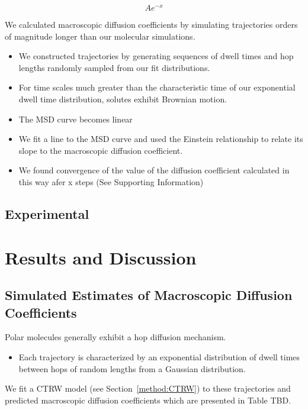 \documentclass{article}
\begin{document}
  \begin{equation}
	Ae^{-x}
  \end{equation}

  We calculated macroscopic diffusion coefficients by simulating trajectories orders of
  magnitude longer than our molecular simulations. 
  \begin{itemize}
	\item We constructed trajectories by generating sequences of dwell times 
        and hop lengths randomly sampled from our fit distributions.
	\item For time scales much greater than the characteristic time of our
	exponential dwell time distribution, solutes exhibit Brownian motion. 
	\item The MSD curve becomes linear
	\item We fit a line to the MSD curve and used the Einstein relationship
	to relate its slope to the macroscopic diffusion coefficient.
	\item We found convergence of the value of the diffusion coefficient 
	calculated in this way afer x steps (See Supporting Information)
  \end{itemize}

  \subsection{Experimental}
   
  \section{Results and Discussion}

  \subsection{Simulated Estimates of Macroscopic Diffusion Coefficients}\label{section:D_macro}
 
  Polar molecules generally exhibit a hop diffusion mechanism. 
  \begin{itemize}
	\item Each trajectory is characterized by an exponential distribution of
	dwell times between hops of random lengths from a Gaussian distribution.
  \end{itemize}

  We fit a CTRW model (see Section~\ref{method:CTRW}) to these 
  trajectories and predicted macroscopic diffusion coefficients which are
  presented in Table TBD.
\end{document}
